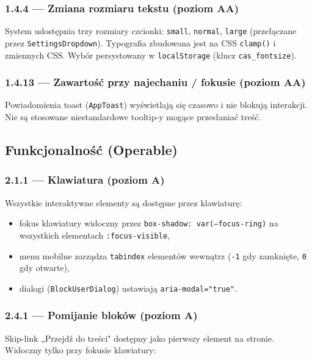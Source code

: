 \documentclass[12pt, a4paper]{article}
\begin{document}
\subsubsection{1.4.4 — Zmiana rozmiaru tekstu (poziom AA)}

System udostępnia trzy rozmiary czcionki: \texttt{small}, \texttt{normal}, \texttt{large}
(przełączane przez \texttt{SettingsDropdown}). Typografia zbudowana jest na CSS
\texttt{clamp()} i zmiennych CSS. Wybór persystowany w \texttt{localStorage}
(klucz \texttt{cas\_fontsize}).

\subsubsection{1.4.13 — Zawartość przy najechaniu / fokusie (poziom AA)}

Powiadomienia toast (\texttt{AppToast}) wyświetlają się czasowo i nie blokują interakcji.
Nie są stosowane niestandardowe tooltip-y mogące przesłaniać treść.

\subsection{Funkcjonalność (Operable)}

\subsubsection{2.1.1 — Klawiatura (poziom A)}

Wszystkie interaktywne elementy są dostępne przez klawiaturę:

\begin{itemize}
  \item fokus klawiatury widoczny przez \texttt{box-shadow: var(--focus-ring)}
        na wszystkich elementach \texttt{:focus-visible},
  \item menu mobilne zarządza \texttt{tabindex} elementów wewnątrz
        (\texttt{-1} gdy zamknięte, \texttt{0} gdy otwarte),
  \item dialogi (\texttt{BlockUserDialog}) ustawiają \texttt{aria-modal="true"}.
\end{itemize}

\subsubsection{2.4.1 — Pomijanie bloków (poziom A)}

Skip-link „Przejdź do treści" dostępny jako pierwszy element na stronie.
Widoczny tylko przy fokusie klawiatury:
\end{document}
